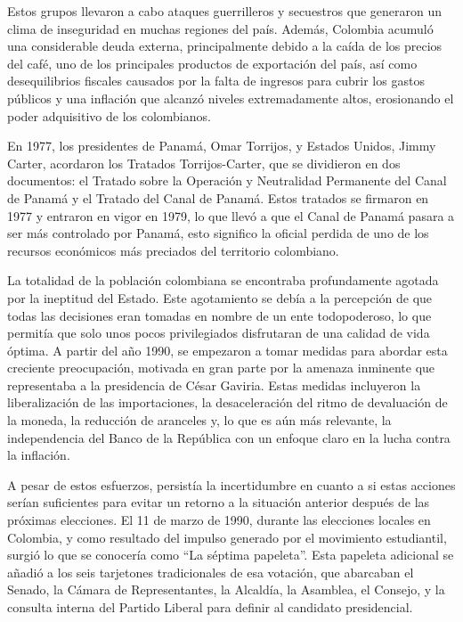 \documentclass[letterpaper, 12pt]{article}
\begin{document}
Estos grupos llevaron a cabo ataques guerrilleros y
secuestros que generaron un clima de inseguridad en muchas
regiones del país. Además, Colombia acumuló una
considerable deuda externa, principalmente debido a la
caída de los precios del café, uno de los principales
productos de exportación del país, así como desequilibrios
fiscales causados por la falta de ingresos para cubrir los
gastos públicos y una inflación que alcanzó niveles
extremadamente altos, erosionando el poder adquisitivo de
los colombianos.



En 1977, los presidentes de Panamá, Omar Torrijos, y
Estados Unidos, Jimmy Carter, acordaron los Tratados
Torrijos-Carter, que se dividieron en dos documentos: el
Tratado sobre la Operación y Neutralidad Permanente del
Canal de Panamá y el Tratado del Canal de Panamá. Estos
tratados se firmaron en 1977 y entraron en vigor en 1979,
lo que llevó a que el Canal de Panamá pasara a ser más
controlado por Panamá, esto significo la oficial perdida de
uno de los recursos económicos más preciados del territorio
colombiano.

La totalidad de la población colombiana se encontraba
profundamente agotada por la ineptitud del Estado. Este
agotamiento se debía a la percepción de que todas las
decisiones eran tomadas en nombre de un ente todopoderoso,
lo que permitía que solo unos pocos privilegiados
disfrutaran de una calidad de vida óptima. A partir del año
1990, se empezaron a tomar medidas para abordar esta
creciente preocupación, motivada en gran parte por la
amenaza inminente que representaba a la presidencia de
César Gaviria. Estas medidas incluyeron la liberalización
de las importaciones, la desaceleración del ritmo de
devaluación de la moneda, la reducción de aranceles y, lo
que es aún más relevante, la independencia del Banco de la
República con un enfoque claro en la lucha contra la
inflación.

A pesar de estos esfuerzos, persistía la incertidumbre en
cuanto a si estas acciones serían suficientes para evitar
un retorno a la situación anterior después de las próximas
elecciones. El 11 de marzo de 1990, durante las elecciones
locales en Colombia, y como resultado del impulso generado
por el movimiento estudiantil, surgió lo que se conocería
como ``La séptima papeleta''. Esta papeleta adicional se
añadió a los seis tarjetones tradicionales de esa votación,
que abarcaban el Senado, la Cámara de Representantes, la
Alcaldía, la Asamblea, el Consejo, y la consulta interna
del Partido Liberal para definir al candidato presidencial.
\end{document}
